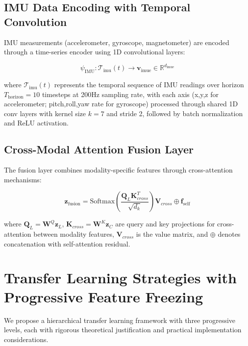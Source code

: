 \documentclass[10pt,twocolumn,letterpaper]{article}
\begin{document}
\subsection{IMU Data Encoding with Temporal Convolution}

IMU measurements (accelerometer, gyroscope, magnetometer) are encoded through a time-series encoder using 1D convolutional layers:

\begin{equation}
    \psi_\text{IMU}: \mathcal{T}_\text{imu}(t) \rightarrow \mathbf{v}_\text{imue} \in \mathbb{R}^{d_\text{imue}}
    \label{eq:imu_encoding}
\end{equation}

where $\mathcal{T}_\text{imu}(t)$ represents the temporal sequence of IMU readings over horizon $T_\text{horizon} = 10$ timesteps at 200Hz sampling rate, with each axis (x,y,z for accelerometer; pitch,roll,yaw rate for gyroscope) processed through shared 1D conv layers with kernel size $k=7$ and stride 2, followed by batch normalization and ReLU activation.

\subsection{Cross-Modal Attention Fusion Layer}

The fusion layer combines modality-specific features through cross-attention mechanisms:

\begin{equation}
    \mathbf{z}_\text{fusion} = \text{Softmax}\left(\frac{\mathbf{Q}_L\mathbf{K}_{cross}^T}{\sqrt{d_k}}\right)\mathbf{V}_{cross} \oplus \mathbf{f}_\text{self}
    \label{eq:cross_attention_fusion}
\end{equation}

where $\mathbf{Q}_L = \mathbf{W}^Q\mathbf{z}_L$, $\mathbf{K}_{cross} = \mathbf{W}^K\mathbf{z}_C$ are query and key projections for cross-attention between modality features, $\mathbf{V}_{cross}$ is the value matrix, and $\oplus$ denotes concatenation with self-attention residual.

\section{Transfer Learning Strategies with Progressive Feature Freezing}

We propose a hierarchical transfer learning framework with three progressive levels, each with rigorous theoretical justification and practical implementation considerations.
\end{document}
